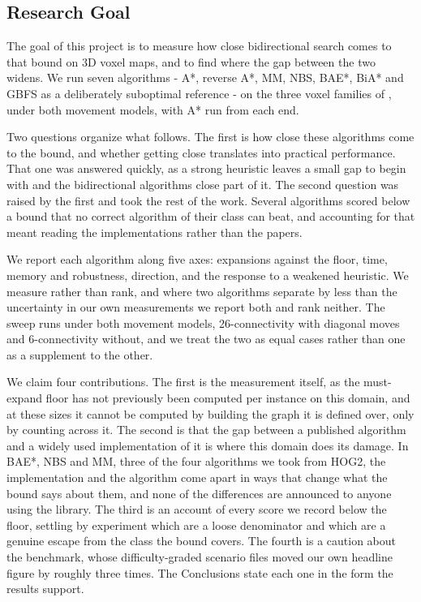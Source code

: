 \documentclass[letterpaper]{article} %
\begin{document}
\subsection{Research Goal}

The goal of this project is to measure how close bidirectional search comes to that bound on 3D voxel maps, and to find where the gap between the two widens. We run seven algorithms - A*, reverse A*, MM, NBS, BAE*, BiA* and GBFS as a deliberately suboptimal reference - on the three voxel families of \citet{nobes2023voxel}, under both movement models, with A* run from each end.

Two questions organize what follows. The first is how close these algorithms come to the bound, and whether getting close translates into practical performance. That one was answered quickly, as a strong heuristic leaves a small gap to begin with and the bidirectional algorithms close part of it. The second question was raised by the first and took the rest of the work. Several algorithms scored below a bound that no correct algorithm of their class can beat, and accounting for that meant reading the implementations rather than the papers.

We report each algorithm along five axes: expansions against the floor, time, memory and robustness, direction, and the response to a weakened heuristic. We measure rather than rank, and where two algorithms separate by less than the uncertainty in our own measurements we report both and rank neither. The sweep runs under both movement models, 26-connectivity with diagonal moves and 6-connectivity without, and we treat the two as equal cases rather than one as a supplement to the other.

We claim four contributions. The first is the measurement itself, as the must-expand floor has not previously been computed per instance on this domain, and at these sizes it cannot be computed by building the graph it is defined over, only by counting across it. The second is that the gap between a published algorithm and a widely used implementation of it is where this domain does its damage. In BAE*, NBS and MM, three of the four algorithms we took from HOG2, the implementation and the algorithm come apart in ways that change what the bound says about them, and none of the differences are announced to anyone using the library. The third is an account of every score we record below the floor, settling by experiment which are a loose denominator and which are a genuine escape from the class the bound covers. The fourth is a caution about the benchmark, whose difficulty-graded scenario files moved our own headline figure by roughly three times. The Conclusions state each one in the form the results support.
\end{document}
